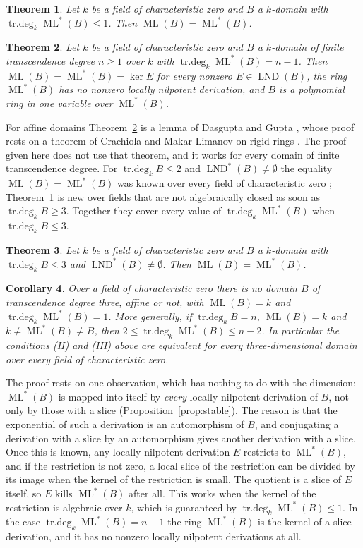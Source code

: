 \documentclass[11pt]{amsart}
\newtheorem{mainthm}{Theorem}
\newtheorem{maincor}[mainthm]{Corollary}
\theoremstyle{definition}
\DeclareMathOperator{\ML}{ML}
\DeclareMathOperator{\LND}{LND}
\DeclareMathOperator{\trdeg}{tr.deg}
\newcommand{\MLs}{\ML^{*}}
\newcommand{\LNDs}{\LND^{*}}
\newcommand{\td}[1]{\trdeg_k #1}
\begin{document}
\begin{mainthm}\label{thmA}
Let $k$ be a field of characteristic zero and $B$ a $k$-domain with $\td{\MLs(B)}\le 1$. Then $\ML(B)=\MLs(B)$.
\end{mainthm}

\begin{mainthm}\label{thmB}
Let $k$ be a field of characteristic zero and $B$ a $k$-domain of finite transcendence degree $n\ge1$ over $k$ with $\td{\MLs(B)}=n-1$. Then $\ML(B)=\MLs(B)=\ker E$ for every nonzero $E\in\LND(B)$, the ring $\MLs(B)$ has no nonzero locally nilpotent derivation, and $B$ is a polynomial ring in one variable over $\MLs(B)$.
\end{mainthm}

For affine domains Theorem~\ref{thmB} is a lemma of Dasgupta and Gupta \cite[Lemma~3.2]{DG21}, whose proof rests on a theorem of Crachiola and Makar-Limanov on rigid rings \cite{CML05}. The proof given here does not use that theorem, and it works for every domain of finite transcendence degree. For $\td{B}\le2$ and $\LNDs(B)\neq\emptyset$ the equality $\ML(B)=\MLs(B)$ was known over every field of characteristic zero \cite{DG21,Sai24}; Theorem~\ref{thmA} is new over fields that are not algebraically closed as soon as $\td{B}\ge3$. Together they cover every value of $\td{\MLs(B)}$ when $\td{B}\le 3$.

\begin{mainthm}\label{thmC}
Let $k$ be a field of characteristic zero and $B$ a $k$-domain with $\td{B}\le 3$ and $\LNDs(B)\neq\emptyset$. Then $\ML(B)=\MLs(B)$.
\end{mainthm}

\begin{maincor}\label{corD}
Over a field of characteristic zero there is no domain $B$ of transcendence degree three, affine or not, with $\ML(B)=k$ and $\td{\MLs(B)}=1$. More generally, if $\td{B}=n$, $\ML(B)=k$ and $k\neq\MLs(B)\neq B$, then $2\le\td{\MLs(B)}\le n-2$. In particular the conditions (II) and (III) above are equivalent for every three-dimensional domain over every field of characteristic zero.
\end{maincor}

The proof rests on one observation, which has nothing to do with the dimension: $\MLs(B)$ is mapped into itself by \emph{every} locally nilpotent derivation of $B$, not only by those with a slice (Proposition~\ref{prop:stable}). The reason is that the exponential of such a derivation is an automorphism of $B$, and conjugating a derivation with a slice by an automorphism gives another derivation with a slice. Once this is known, any locally nilpotent derivation $E$ restricts to $\MLs(B)$, and if the restriction is not zero, a local slice of the restriction can be divided by its image when the kernel of the restriction is small. The quotient is a slice of $E$ itself, so $E$ kills $\MLs(B)$ after all. This works when the kernel of the restriction is algebraic over $k$, which is guaranteed by $\td{\MLs(B)}\le1$. In the case $\td{\MLs(B)}=n-1$ the ring $\MLs(B)$ is the kernel of a slice derivation, and it has no nonzero locally nilpotent derivations at all.
\end{document}
